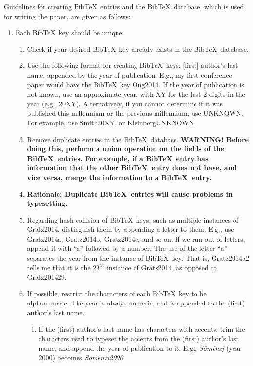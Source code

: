 \documentclass[letter,12pt]{article}
\begin{document}
Guidelines for creating {\sc Bib}\TeX\ entries and the {\sc Bib}\TeX\ database, which is used for writing the paper, are given as follows: \vspace{-0.3cm}
\begin{enumerate} \itemsep -4pt
\item Each {\sc Bib}\TeX\ key should be unique: \vspace{-0.3cm}
	\begin{enumerate} \itemsep -2pt
	\item Check if your desired {\sc Bib}\TeX\ key already exists in the {\sc Bib}\TeX\ database.
	\item Use the following format for creating {\sc Bib}\TeX\ keys: [first] author's last name, appended by the year of publication. E.g., my first conference paper would have the {\sc Bib}\TeX\ key Ong2014. If the year of publication is not known, use an approximate year, with XY for the last 2 digits in the year (e.g., 20XY). Alternatively, if you cannot determine if it was published this millennium or the previous millennium, use UNKNOWN. For example, use Smith20XY, or KleinbergUNKNOWN.
	\item Remove duplicate entries in the {\sc Bib}\TeX\ database. {\bf WARNING! Before doing this, perform a union operation on the fields of the {\sc Bib}\TeX\ entries. For example, if a {\sc Bib}\TeX\ entry has information that the other {\sc Bib}\TeX\ entry does not have, and vice versa, merge the information to a {\sc Bib}\TeX\ entry.}
	\item {\bf Rationale: Duplicate {\sc Bib}\TeX\ entries will cause problems in typesetting.}
	\item Regarding hash collision of {\sc Bib}\TeX\ keys, such as multiple instances of Gratz2014, distinguish them by appending a letter to them. E.g., use Gratz2014a, Gratz2014b, Gratz2014c, and so on. If we run out of letters, append it with ``a'' followed by a number. The use of the letter ``a'' separates the year from the instance of {\sc Bib}\TeX\ key. That is, Gratz2014a2 tells me that it is the $29^{th}$ instance of Gratz2014, as opposed to Gratz201429.
	\item If possible, restrict the characters of each {\sc Bib}\TeX\ key to be alphanumeric. The year is always numeric, and is appended to the (first) author's last name. \vspace{-0.2cm}
		\begin{enumerate} \itemsep -2pt
		\item If the (first) author's last name has characters with accents, trim the characters used to typeset the accents from the (first) author's last name, and append the year of publication to it. E.g., {\it S{\v{o}}m{\'{e}}nz{\d{i}}} (year 2000) becomes {\it Somenzi2000}.

\end{enumerate}
\end{enumerate}
\end{enumerate}
\end{document}
